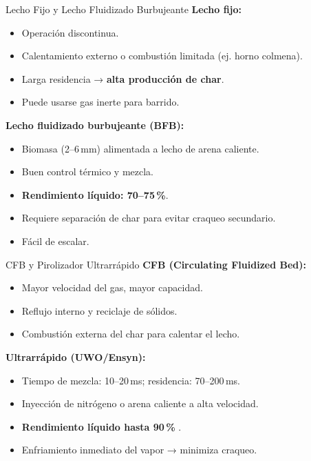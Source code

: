 \documentclass[../../main.tex]{subfiles}
\begin{document}
\begin{frame}{Lecho Fijo y Lecho Fluidizado Burbujeante}
\small
\textbf{Lecho fijo:}
\begin{itemize}
  \item Operación discontinua.
  \item Calentamiento externo o combustión limitada (ej. horno colmena).
  \item Larga residencia → \textbf{alta producción de char}.
  \item Puede usarse gas inerte para barrido.
\end{itemize}

\vspace{0.2cm}
\textbf{Lecho fluidizado burbujeante (BFB):}
\begin{itemize}
  \item Biomasa (2–6 mm) alimentada a lecho de arena caliente.
  \item Buen control térmico y mezcla.
  \item \textbf{Rendimiento líquido: 70–75\,\%}.
  \item Requiere separación de char para evitar craqueo secundario.
  \item Fácil de escalar.
\end{itemize}
\end{frame}

\begin{frame}{CFB y Pirolizador Ultrarrápido}
\small
\textbf{CFB (Circulating Fluidized Bed):}
\begin{itemize}
  \item Mayor velocidad del gas, mayor capacidad.
  \item Reflujo interno y reciclaje de sólidos.
  \item Combustión externa del char para calentar el lecho.
\end{itemize}

\vspace{0.2cm}
\textbf{Ultrarrápido (UWO/Ensyn):}
\begin{itemize}
  \item Tiempo de mezcla: 10–20 ms; residencia: 70–200 ms.
  \item Inyección de nitrógeno o arena caliente a alta velocidad.
  \item \textbf{Rendimiento líquido hasta 90\,\%} \cite{Hulet2005}.
  \item Enfriamiento inmediato del vapor → minimiza craqueo.
\end{itemize}
\end{frame}
\end{document}
